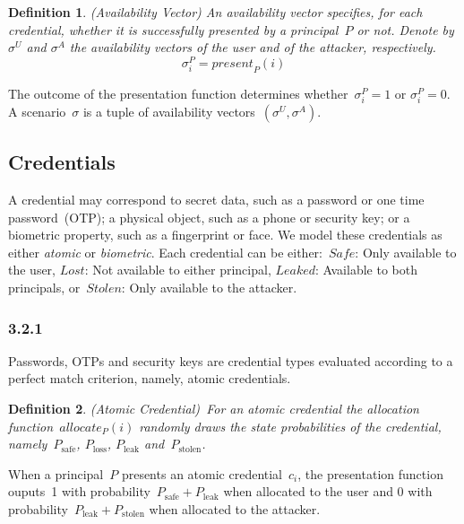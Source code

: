 \documentclass[conference,compsoc]{IEEEtran}
\newtheorem{definition}{Definition}
\begin{document}
\begin{definition}(Availability Vector)
    An \emph{availability vector} specifies, for each credential, whether it is successfully presented by a principal~$P$ or not. Denote by $\sigma^U$ \textit{and} $\sigma^A$ the availability vectors of the user and of the attacker, respectively.
    \begin{equation*}
    \sigma_i^P = \textit{present}_P(i)
    \end{equation*}
\end{definition}
The outcome of the presentation function determines whether~$\sigma_i^P=1$ or $\sigma_i^P=0$. A scenario~$\sigma$ is a tuple of availability vectors~$(\sigma^U, \sigma^A)$. 

\subsection{Credentials}\label{sec:credentials}
\noindent
A credential may correspond to secret data, such as a password or one time password~(OTP); a physical object, such as a phone or security key; or a biometric property, such as a fingerprint or face. We model these credentials as either \emph{atomic} or \emph{biometric}. Each credential can be either:~$\textit{Safe}$: Only available to the user, $\textit{Lost}$: Not available to either principal, $\textit{Leaked}$: Available to both principals, or~$\textit{Stolen}$: Only available to the attacker.
\subsubsection*{3.2.1}\label{sec:3.2.1}
Passwords, OTPs and security keys are credential types evaluated according to a perfect match criterion, namely, atomic credentials.
\begin{definition} (Atomic Credential)~For an atomic credential the allocation function~$\textit{allocate}_P(i)$ randomly draws the state probabilities of the credential, namely~$P_{\text{safe}}$, $P_{\text{loss}}$, $P_{\text{leak}}$ and~$P_{\text{stolen}}$.
\end{definition}
When a principal~$P$ presents an atomic credential~$c_i$, the presentation function ouputs~1 with probability~$P_{\text{safe}} + P_{\text{leak}}$ when allocated to the user and 0 with probability~$P_{\text{leak}} + P_{\text{stolen}}$ when allocated to the attacker.
\end{document}
